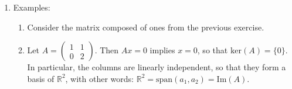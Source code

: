 {\begin{enumerate}
\begin{enumerate}
\begin{align*}
	=\begin{pmatrix}0\\0\end{pmatrix}\in\im(A)\\
	&x=\begin{pmatrix}1\\1\end{pmatrix}~~
	\Rightarrow~~A\begin{pmatrix}1\\1\end{pmatrix}
	=1\cdot\begin{matrix}|\\a_1\\|\end{matrix}+1\cdot\begin{matrix}|\\a_2\\|\end{matrix}
	=a_1+a_2\in\im(A)\\
	&x=\begin{pmatrix}1\\0\end{pmatrix}~~
	\Rightarrow~~Ax=a_1\in\im(A)\\
	&x=\begin{pmatrix}0\\1\end{pmatrix}~~
	\Rightarrow~~Ax=a_2\in\im(A)\\
	\end{align*}
	In general $e_j:=\begin{pmatrix}0\\\vdots\\1\\\vdots\\0\end{pmatrix}\leftarrow \text{j-th}~~\in\mathbb{F}^n$, then $Ae_j=a_j$.
\end{enumerate}
\item Examples:
\begin{enumerate}
	\item Consider the matrix composed of ones from the previous exercise.
	\item Let $A = \begin{pmatrix}
	1&1\\0&2
	\end{pmatrix}$.
	Then $Ax = 0$ implies $x=0$, so that $\text{ker}(A)=\{0\}$. In particular, the columns are linearly independent, so that they form a basis of $\mathbb{R}^2$, with other words: $\mathbb{R}^2 = \text{span}(a_1,a_2)=\text{Im}(A)$.
\end{enumerate}
\end{enumerate}
}
